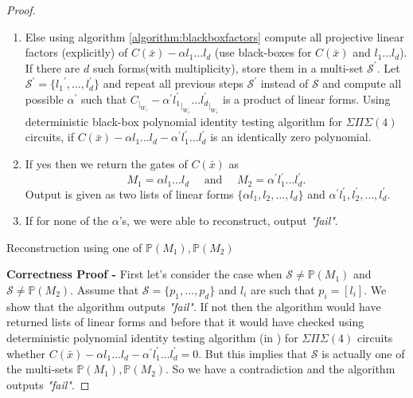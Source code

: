 \documentclass[12pt]{caltech_thesis}
\theoremstyle{plain}
\theoremstyle{definition}
\newcommand{\MS}{\mathcal{S}}
\newcommand{\PP}{\mathbb{P}}
\newcommand{\B}[1]{\bar{#1}}
\begin{document}
\begin{proof}
\begin{algorithm}[H]
\begin{enumerate}
\item Else using algorithm \ref{algorithm:blackboxfactors} compute all projective linear factors (explicitly)
of $C(\B{x}) - \alpha l_1\ldots l_d$ (use black-boxes for $C(\B{x})$ and $l_1\ldots l_d$). If there are $d$ such forms(with multiplicity), 
store them in a multi-set $\MS^\prime$. Let $\MS^\prime = \{{l_1}^\prime,\ldots,l_d^\prime\}$ and repeat 
all previous steps  $\MS^\prime$ instead of $\MS$ and compute all possible $\alpha^\prime$ such that
$C_{|_{W_r}} - \alpha^\prime {l_1^\prime}_{|_{W_r}}\ldots {l_d^\prime}_{|_{W_r}}$ is a product of linear forms. 
Using deterministic black-box polynomial identity testing algorithm for $\Sigma\Pi\Sigma(4)$ circuits, 
if $C(\B{x}) - \alpha l_1\ldots l_d - \alpha^\prime l_1^\prime\ldots l_d^\prime$ 
is an identically zero polynomial. 
\item If yes then we return the gates of $C(\B{x})$ as
\[M_1 =\alpha l_1\ldots l_d \hspace{1em}\text{ and }\hspace{1em} M_2 = \alpha^\prime l_1^\prime\ldots l_d^\prime.\] 
 Output is given as two lists of linear forms $\{\alpha l_1, l_2,\ldots, l_d\}$ and $\alpha^\prime l_1^\prime, l_2^\prime,\ldots,l_d^\prime$.
\item If for none of the $\alpha$'s, we were able to reconstruct, output \emph{"fail"}.
 
 \end{enumerate}
\caption{Reconstruction using one of $\PP(M_1),\PP(M_2)$}
\end{algorithm}
\vspace{1.5em}
\textbf{Correctness Proof - } 
First let's consider the case when $\MS \neq \PP(M_1)$ and $\MS\neq \PP(M_2)$. Assume that $\MS = \{p_1,\ldots,p_d\}$ and
$l_i$ are such that $p_i = [l_i]$.  We show that the algorithm outputs \emph{"fail"}. If not then the algorithm would have returned lists of 
linear forms
and before that it would have checked using deterministic polynomial identity testing algorithm (in \cite{SS10}) 
for $\Sigma\Pi\Sigma(4)$ circuits whether
$C(\B{x}) - \alpha l_1\ldots l_d - \alpha^\prime l_1^\prime\ldots l_d^\prime = 0$. But this implies that $\MS$ is actually one
of the multi-sets $\PP(M_1),\PP(M_2)$. So we have a contradiction and the algorithm outputs \emph{"fail"}.


\end{proof}
\end{document}
